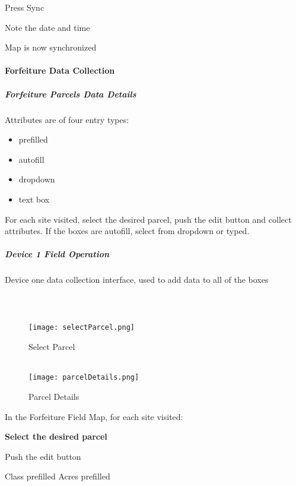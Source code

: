 \documentclass[class=article , crop=false, titlepage, twoside, multi={itemize, figure, verbatim}, float=false]{standalone}
\begin{document}
\noindent Press \Large Sync
\vspace{1.5in}

\Large Note the date and time
\vspace{1.5in}

Map is now synchronized

\clearpage
\paragraph{Forfeiture Data Collection}
\subparagraph{Forfeiture Parcels Data Details}
Attributes are of four entry types:\begin{itemize}
\item prefilled
\item autofill
\item dropdown
\item text box \end{itemize}
For each site visited, select the desired parcel, push the edit button and collect attributes.  If the boxes are autofill, select from dropdown or typed.\bigskip 

\clearpage
\subparagraph{Device 1 Field Operation}Device one data collection interface, used to add data to all of the boxes
\subparagraph*{\\}
\begin{wrapfigure}{r}{0.5\textwidth}
\centering
\texttt{[image: selectParcel.png]}
\caption {Select Parcel}
\vspace{.25in}
\HRule \\[.4cm] %
\vspace{.25in}
\texttt{[image: parcelDetails.png]}
\caption{Parcel Details}
\end{wrapfigure}
\vspace{1in}

In the Forfeiture Field Map, for each site visited:\\
\vspace{1in}

\textbf{Select the desired parcel}
\vspace{3in}

Push the \Large edit button 

\clearpage
Class prefilled
Acres prefilled
\end{document}
